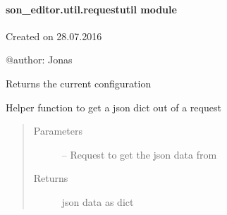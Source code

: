 \documentclass[letterpaper,10pt,english]{sphinxmanual}
\begin{document}
\paragraph{son\_editor.util.requestutil module}
\label{_source/son_editor.util:module-son_editor.util.requestutil}\label{_source/son_editor.util:son-editor-util-requestutil-module}
Created on 28.07.2016

@author: Jonas

\begin{fulllineitems}
\label{_source/son_editor.util:son_editor.util.requestutil.get_config}
Returns the current configuration

\end{fulllineitems}


\begin{fulllineitems}
\label{_source/son_editor.util:son_editor.util.requestutil.get_json}
Helper function to get a json dict out of a request
\begin{quote}\begin{description}
\item[{Parameters}] \leavevmode
{} -- Request to get the json data from

\item[{Returns}] \leavevmode
json data as dict

\end{description}\end{quote}

\end{fulllineitems}

\end{document}

